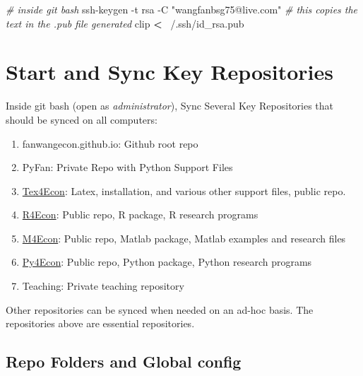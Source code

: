 \documentclass[]{article}
\newenvironment{Shaded}{\begin{snugshade}}{\end{snugshade}}
\newcommand{\CommentTok}[1]{\textcolor[rgb]{0.56,0.35,0.01}{\textit{#1}}}
\newcommand{\ExtensionTok}[1]{#1}
\newcommand{\FunctionTok}[1]{\textcolor[rgb]{0.00,0.00,0.00}{#1}}
\newcommand{\NormalTok}[1]{#1}
\newcommand{\OperatorTok}[1]{\textcolor[rgb]{0.81,0.36,0.00}{\textbf{#1}}}
\newcommand{\StringTok}[1]{\textcolor[rgb]{0.31,0.60,0.02}{#1}}
\providecommand{\tightlist}{%
  \setlength{\itemsep}{0pt}\setlength{\parskip}{0pt}}
\begin{document}
\begin{Shaded}
\begin{Highlighting}[]
\CommentTok{# inside git bash}
\FunctionTok{ssh-keygen}\NormalTok{ -t rsa -C }\StringTok{"wangfanbsg75@live.com"}
\CommentTok{# this copies the text in the .pub file generated}
\ExtensionTok{clip} \OperatorTok{<}\NormalTok{ ~/.ssh/id_rsa.pub}
\end{Highlighting}
\end{Shaded}

\hypertarget{start-and-sync-key-repositories}{%
\section{Start and Sync Key
Repositories}\label{start-and-sync-key-repositories}}

Inside git bash (open as \emph{administrator}), Sync Several Key
Repositories that should be synced on all computers:

\begin{enumerate}
\def\labelenumi{\arabic{enumi}.}
\tightlist
\item
  fanwangecon.github.io: Github root repo
\item
  PyFan: Private Repo with Python Support Files
\item
  \href{https://github.com/FanWangEcon/Tex4Econ}{Tex4Econ}: Latex,
  installation, and various other support files, public repo.
\item
  \href{https://github.com/FanWangEcon/R4Econ}{R4Econ}: Public repo, R
  package, R research programs
\item
  \href{https://github.com/FanWangEcon/M4Econ}{M4Econ}: Public repo,
  Matlab package, Matlab examples and research files
\item
  \href{https://github.com/FanWangEcon/Py4Econ}{Py4Econ}: Public repo,
  Python package, Python research programs
\item
  Teaching: Private teaching repository
\end{enumerate}

Other repositories can be synced when needed on an ad-hoc basis. The
repositories above are essential repositories.

\hypertarget{repo-folders-and-global-config}{%
\subsection{Repo Folders and Global
config}\label{repo-folders-and-global-config}}
\end{document}
